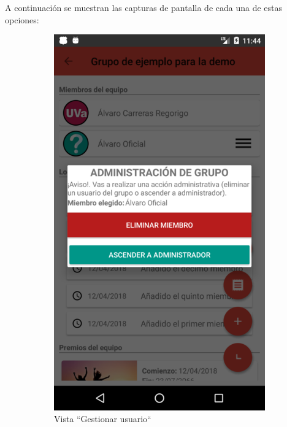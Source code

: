 \documentclass[twoside]{report}
\begin{document}
A continuación se muestran las capturas de pantalla de cada una de estas opciones:
\begin{figure}[H]
\begin{center}
	\begin{subfigure}[t]{.3\linewidth}
		\includegraphics[scale=0.2]{images/userguide/15a.png}
		\caption{Vista “Gestionar usuario“}
	\end{subfigure}\hspace{2mm}%
	\begin{subfigure}[t]{.3\linewidth}

\end{subfigure}
\end{center}
\end{figure}
\end{document}
